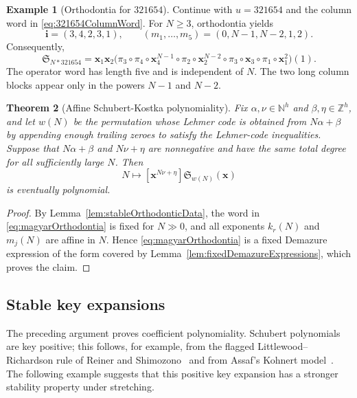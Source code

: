 \documentclass[11pt,reqno]{amsart}
\newtheorem{theorem}{Theorem}[section]
\theoremstyle{definition}
\newtheorem{example}[theorem]{Example}
\newcommand{\setN}{\mathbb{N}}
\newcommand{\setZ}{\mathbb{Z}}
\newcommand{\xvec}{\mathbf{x}}
\newcommand{\schubertS}{\mathfrak{S}}
\newcommand{\stretchop}{\mathbin{\ast}}
\newcommand{\stretchperm}[2]{#1\stretchop #2}
\begin{document}
\begin{example}[Orthodontia for \(321654\)]
\label{ex:orthodontia321654}
Continue with \(u=321654\) and the column word in
\eqref{eq:321654ColumnWord}.  For \(N\geq3\), orthodontia yields
\[
\mathbf{i}=(3,4,2,3,1),
\qquad
(m_1,\dotsc,m_5)=(0,N-1,N-2,1,2).
\]
Consequently,
\[
\schubertS_{\stretchperm{N}{321654}}
=
\xvec_1\xvec_2
\bigl(
\pi_3\circ\pi_4\circ \xvec_4^{N-1}
\circ\pi_2\circ \xvec_2^{N-2}
\circ\pi_3\circ \xvec_3
\circ\pi_1\circ \xvec_1^2
\bigr)(1).
\]
The operator word has length five and is independent of \(N\).  The two long
column blocks appear only in the powers \(N-1\) and \(N-2\).
\end{example}

\begin{theorem}[Affine Schubert-Kostka polynomiality]
\label{thm:affineSchubertKostka}
Fix \(\alpha,\nu\in\setN^h\) and \(\beta,\eta\in\setZ^h\), and let \(w(N)\)
be the permutation whose Lehmer code is obtained from \(N\alpha+\beta\) by
appending enough trailing zeroes to satisfy the Lehmer-code inequalities.
Suppose that \(N\alpha+\beta\) and
\(N\nu+\eta\) are nonnegative and have the same total degree for all
sufficiently large \(N\).  Then
\[
N\longmapsto
[\xvec^{N\nu+\eta}]\schubertS_{w(N)}(\xvec)
\]
is eventually polynomial.
\end{theorem}

\begin{proof}
By Lemma~\ref{lem:stableOrthodonticData}, the word in
\eqref{eq:magyarOrthodontia} is fixed for \(N\gg0\), and all exponents
\(k_r(N)\) and \(m_j(N)\) are affine in \(N\).  Hence
\eqref{eq:magyarOrthodontia} is a fixed Demazure expression of the form
covered by Lemma~\ref{lem:fixedDemazureExpressions}, which proves the claim.
\end{proof}

\subsection{Stable key expansions}

The preceding argument proves coefficient polynomiality.  Schubert polynomials
are key positive; this follows, for example, from the flagged
Littlewood--Richardson rule of Reiner and Shimozono~\cite{ReinerShimozono1995}
and from Assaf's Kohnert model~\cite{Assaf2021}.  The following example
suggests that this positive key expansion has a stronger stability property
under stretching.
\end{document}
